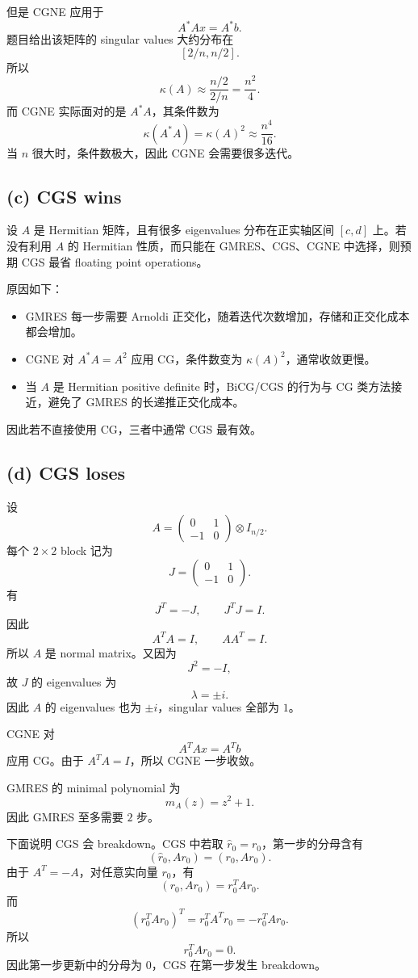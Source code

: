 \documentclass[11pt]{ctexart}
\begin{document}
但是 CGNE 应用于
\[
A^*Ax=A^*b.
\]
题目给出该矩阵的 singular values 大约分布在
\[
[2/n,n/2].
\]
所以
\[
\kappa(A)\approx \frac{n/2}{2/n}=\frac{n^2}{4}.
\]
而 CGNE 实际面对的是 $A^*A$，其条件数为
\[
\kappa(A^*A)=\kappa(A)^2\approx \frac{n^4}{16}.
\]
当 $n$ 很大时，条件数极大，因此 CGNE 会需要很多迭代。

\subsection*{(c) CGS wins}
设 $A$ 是 Hermitian 矩阵，且有很多 eigenvalues 分布在正实轴区间 $[c,d]$ 上。若没有利用 $A$ 的 Hermitian 性质，而只能在 GMRES、CGS、CGNE 中选择，则预期 CGS 最省 floating point operations。

原因如下：
\begin{itemize}
  \item GMRES 每一步需要 Arnoldi 正交化，随着迭代次数增加，存储和正交化成本都会增加。
  \item CGNE 对 $A^*A=A^2$ 应用 CG，条件数变为 $\kappa(A)^2$，通常收敛更慢。
  \item 当 $A$ 是 Hermitian positive definite 时，BiCG/CGS 的行为与 CG 类方法接近，避免了 GMRES 的长递推正交化成本。
\end{itemize}
因此若不直接使用 CG，三者中通常 CGS 最有效。

\subsection*{(d) CGS loses}
设
\[
A=\begin{pmatrix}0&1\\-1&0\end{pmatrix}\otimes I_{n/2}.
\]
每个 $2\times2$ block 记为
\[
J=\begin{pmatrix}0&1\\-1&0\end{pmatrix}.
\]
有
\[
J^T=-J, \qquad J^TJ=I.
\]
因此
\[
A^TA=I, \qquad AA^T=I.
\]
所以 $A$ 是 normal matrix。又因为
\[
J^2=-I,
\]
故 $J$ 的 eigenvalues 为
\[
\lambda=\pm i.
\]
因此 $A$ 的 eigenvalues 也为 $\pm i$，singular values 全部为 $1$。

CGNE 对
\[
A^TAx=A^Tb
\]
应用 CG。由于 $A^TA=I$，所以 CGNE 一步收敛。

GMRES 的 minimal polynomial 为
\[
m_A(z)=z^2+1.
\]
因此 GMRES 至多需要 $2$ 步。

下面说明 CGS 会 breakdown。CGS 中若取 $\hat r_0=r_0$，第一步的分母含有
\[
(\hat r_0,Ar_0)=(r_0,Ar_0).
\]
由于 $A^T=-A$，对任意实向量 $r_0$，有
\[
(r_0,Ar_0)=r_0^TAr_0.
\]
而
\[
(r_0^TAr_0)^T=r_0^TA^Tr_0=-r_0^TAr_0.
\]
所以
\[
r_0^TAr_0=0.
\]
因此第一步更新中的分母为 $0$，CGS 在第一步发生 breakdown。
\end{document}
